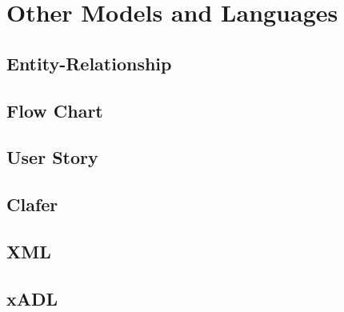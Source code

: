 \section{Other Models and Languages}


\subsection{Entity-Relationship}


\subsection{Flow Chart}


\subsection{User Story}


\subsection{Clafer}


\subsection{XML}


\subsection{xADL}

